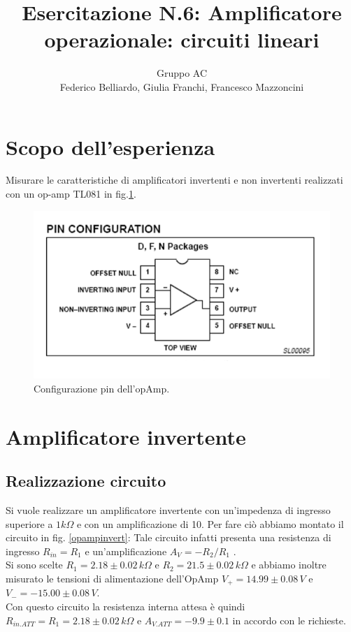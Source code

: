 \documentclass[10pt,a4paper]{article}
\author{Gruppo AC \\ Federico Belliardo, Giulia Franchi, Francesco Mazzoncini}
\title{Esercitazione N.6: Amplificatore operazionale: circuiti lineari}
\begin{document}
\maketitle
\section{Scopo dell'esperienza}

Misurare le caratteristiche di amplificatori invertenti e non invertenti realizzati con un op-amp TL081 in fig.\ref{pin}.
\begin{figure}[!htb]
  \centering
  \includegraphics[scale=0.5]{pinrelaz6.png}
\caption{Configurazione pin dell'opAmp.}
\label{pin}
\end{figure}

\section{Amplificatore invertente}
\subsection{Realizzazione circuito}
Si vuole realizzare un amplificatore invertente con un'impedenza di ingresso superiore a $1k\Omega$ e con un amplificazione di 10. 
Per fare ciò abbiamo montato il circuito in fig. \ref{opampinvert}: Tale circuito infatti presenta una  resistenza di ingresso $R_{in}=R_1$ e un'amplificazione  $A_V=-R_2/R_1$ .\\
Si sono scelte $R_1=2.18 \pm 0.02 \, k\Omega$ e $R_2=21.5 \pm0.02 \, k\Omega$ e abbiamo inoltre misurato le  tensioni di alimentazione dell'OpAmp $V_+=14.99 \pm 0.08 \, V$ e $V_-=-15.00 \pm 0.08 \, V$.\\
Con questo circuito la resistenza interna attesa è quindi $R_{in.ATT}= R_1 = 2.18 \pm 0.02 \, k\Omega$ e $A_{V.ATT}= -9.9 \pm 0.1$ in accordo con le richieste.\\
\end{document}
